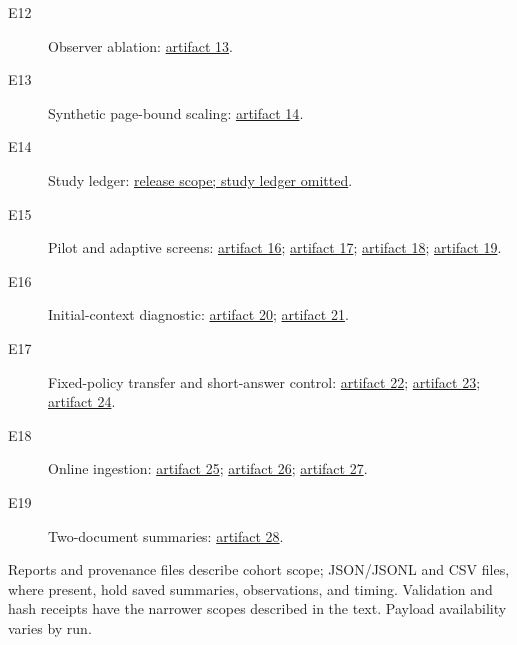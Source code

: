 \begin{description}
\item[E12] Observer ablation: \href{https://github.com/Aperturesurvivor/tiered-kv-cache-research/tree/v1.0.0/results/evidence/attention-observer-ablation-fresh-1}{artifact 13}.
\item[E13] Synthetic page-bound scaling: \href{https://github.com/Aperturesurvivor/tiered-kv-cache-research/blob/v1.0.0/results/evidence/quest-bound-index-scaling-585ce77.json}{artifact 14}.
\item[E14] Study ledger: \href{https://github.com/Aperturesurvivor/tiered-kv-cache-research/blob/v1.0.0/RELEASE-MANIFEST.md}{release scope; study ledger omitted}.
\item[E15] Pilot and adaptive screens: \href{https://github.com/Aperturesurvivor/tiered-kv-cache-research/tree/v1.0.0/results/evidence/semantic-kv-912742d29654}{artifact 16}; \href{https://github.com/Aperturesurvivor/tiered-kv-cache-research/blob/v1.0.0/results/evidence/pilot-c8124d4-first95-samples.jsonl}{artifact 17}; \href{https://github.com/Aperturesurvivor/tiered-kv-cache-research/tree/v1.0.0/results/evidence/demand-Qwen--Qwen2.5-1.5B-Instruct-ablate-02203ec52804}{artifact 18}; \href{https://github.com/Aperturesurvivor/tiered-kv-cache-research/tree/v1.0.0/results/evidence/cross-screen-b5d7283}{artifact 19}.
\item[E16] Initial-context diagnostic: \href{https://github.com/Aperturesurvivor/tiered-kv-cache-research/tree/v1.0.0/results/evidence/prefix-probe-bef94cbbc223}{artifact 20}; \href{https://github.com/Aperturesurvivor/tiered-kv-cache-research/tree/v1.0.0/results/evidence/prefix-sessions-1041bfd3c18b}{artifact 21}.
\item[E17] Fixed-policy transfer and short-answer control: \href{https://github.com/Aperturesurvivor/tiered-kv-cache-research/tree/v1.0.0/results/evidence/attention-transfer-qwen15-a712857-2}{artifact 22}; \href{https://github.com/Aperturesurvivor/tiered-kv-cache-research/tree/v1.0.0/results/evidence/attention-transfer-smol17-a712857-fresh-1}{artifact 23}; \href{https://github.com/Aperturesurvivor/tiered-kv-cache-research/tree/v1.0.0/results/evidence/attention-smol-short-answer-bb5cd6b-fresh-1}{artifact 24}.
\item[E18] Online ingestion: \href{https://github.com/Aperturesurvivor/tiered-kv-cache-research/tree/v1.0.0/results/evidence/demand-Qwen--Qwen2.5-1.5B-Instruct-online-79ab5d653296}{artifact 25}; \href{https://github.com/Aperturesurvivor/tiered-kv-cache-research/tree/v1.0.0/results/evidence/demand-Qwen--Qwen3-0.6B-online-2ceb7f0a1846}{artifact 26}; \href{https://github.com/Aperturesurvivor/tiered-kv-cache-research/tree/v1.0.0/results/evidence/demand-HuggingFaceTB--SmolLM2-1.7B-Instruct-online-ac5605aa219e}{artifact 27}.
\item[E19] Two-document summaries: \href{https://github.com/Aperturesurvivor/tiered-kv-cache-research/tree/v1.0.0/results/evidence/demand-Qwen--Qwen2.5-1.5B-Instruct-summaries-f010bb412d87}{artifact 28}.
\end{description}
Reports and provenance files describe cohort scope; JSON/JSONL and CSV files, where present, hold saved summaries, observations, and timing. Validation and hash receipts have the narrower scopes described in the text. Payload availability varies by run.
